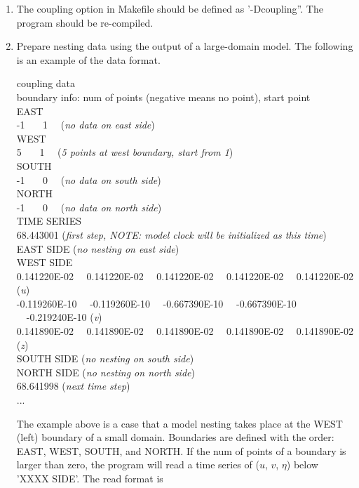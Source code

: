 \documentclass[11pt]{article}
\begin{document}
\begin{enumerate}

\item The coupling option in Makefile should be defined as '-Dcoupling''. The program should be re-compiled.

\item Prepare nesting data using the output of a large-domain model. The following is an example of the data format.

coupling data\\
 boundary info: num of points (negative means no point), start point \\
 EAST \\
          -1    \ \ \       1  \ \ ({\em no data on east side})\\
 WEST \\
           5   \ \ \        1  \ \ ({\em 5 points at west boundary, start from  1}) \\
 SOUTH \\
          -1   \ \ \        0  \ \ ({\em no data on south side}) \\
 NORTH \\
          -1   \ \ \        0  \ \ ({\em no data on north side}) \\
 TIME SERIES \\
   68.443001    ({\em first step, NOTE: model clock will be initialized as this time}) \\
 EAST SIDE  ({\em no nesting on east side})\\
 WEST SIDE \\
    0.141220E-02 \ \   0.141220E-02  \ \  0.141220E-02  \ \  0.141220E-02  \ \  0.141220E-02 ({\em u}) \\
   -0.119260E-10 \ \   -0.119260E-10 \ \  -0.667390E-10  \ \  -0.667390E-10  \ \  -0.219240E-10 ({\em v}) \\
    0.141890E-02  \ \   0.141890E-02  \ \  0.141890E-02  \ \  0.141890E-02  \ \  0.141890E-02   ({\em z}) \\
 SOUTH SIDE ({\em no nesting on south side}) \\
 NORTH SIDE ({\em no nesting on north side}) \\
   68.641998    ({\em next time step}) \\
   ...\
           
The example above is a case that a model nesting  takes place at the WEST (left) boundary of a small domain.   Boundaries are defined with the order: EAST, WEST, SOUTH, and NORTH. If the num of points of a boundary is larger than zero, the program will read a time series of ($u$, $v$, $\eta$) below 'XXXX SIDE'. The read format is


\end{enumerate}
\end{document}
